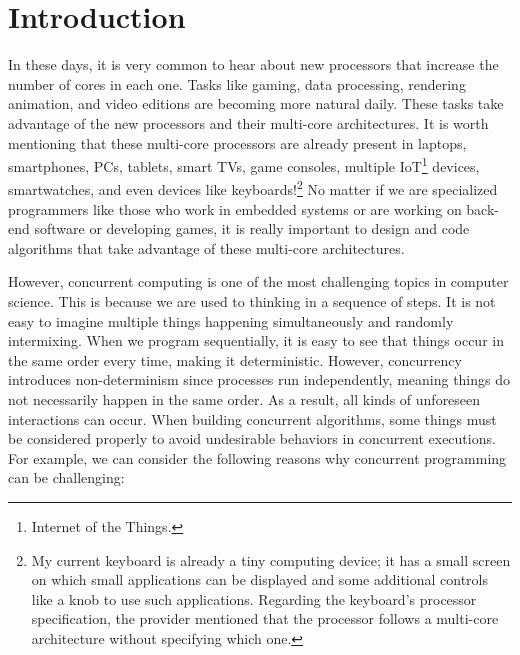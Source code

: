 \chapter{\label{chapter:1_Introduction}Introduction}

In these days, it is very common to hear about new processors that increase the number of cores in each one. Tasks like gaming, data processing, rendering animation, and video editions are becoming more natural daily. These tasks take advantage of the new processors and their multi-core architectures. It is worth mentioning that these multi-core processors are already present in laptops, smartphones, PCs, tablets, smart TVs, game consoles, multiple IoT\footnote{Internet of the Things.} devices, smartwatches, and even devices like keyboards!\footnote{My current keyboard is already a tiny computing device; it has a small screen on which small applications can be displayed and some additional controls like a knob to use such applications. Regarding the keyboard's processor specification, the provider mentioned that the processor follows a multi-core architecture without specifying which one.} No matter if we are specialized programmers like those who work in embedded systems or are working on back-end software or developing games, it is really important to design and code algorithms that take advantage of these multi-core architectures.

However, concurrent computing is one of the most challenging topics in computer science. This is because we are used to thinking in a sequence of steps. It is not easy to imagine multiple things happening simultaneously and randomly intermixing. When we program sequentially, it is easy to see that things occur in the same order every time, making it deterministic. However, concurrency introduces non-determinism since processes run independently, meaning things do not necessarily happen in the same order. As a result, all kinds of unforeseen interactions can occur. When building concurrent algorithms, some things must be considered properly to avoid undesirable behaviors in concurrent executions. For example, we can consider the following reasons why concurrent programming can be challenging:

